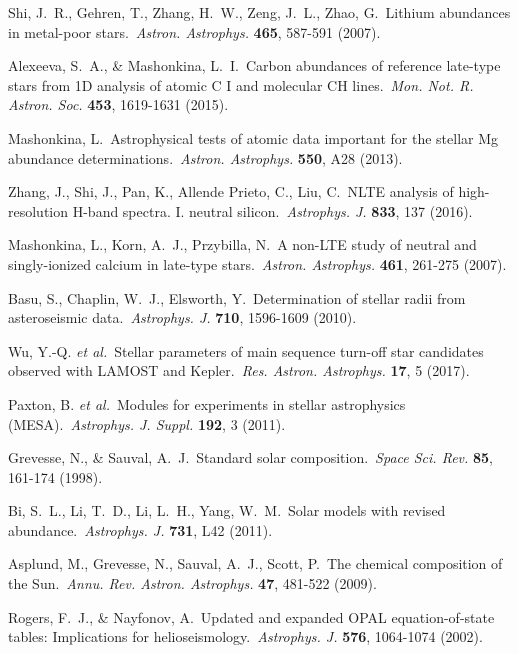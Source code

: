 \documentclass[twoside,onecolumnm,12pt]{article}
\begin{document}
\begin{thebibliography}{99}
 Shi, J.~R., Gehren, T., Zhang, H.~W., Zeng, J.~L., Zhao, G.\ Lithium abundances in metal-poor stars.\ \emph{Astron. Astrophys.} \textbf{465}, 587-591 (2007). %

 Alexeeva, S.~A., \& Mashonkina, L.~I.\ Carbon abundances of reference late-type stars from 1D analysis of atomic C I and molecular CH lines.\ \emph{Mon. Not. R. Astron. Soc.} \textbf{453}, 1619-1631 (2015). %

 Mashonkina, L.\ Astrophysical tests of atomic data important for the stellar Mg abundance determinations.\ \emph{Astron. Astrophys.} \textbf{550}, A28 (2013). %

 Zhang, J., Shi, J., Pan, K., Allende Prieto, C., Liu, C.\ NLTE analysis of high-resolution H-band spectra. I. neutral silicon.\ \emph{Astrophys. J.} \textbf{833}, 137 (2016). %

 Mashonkina, L., Korn, A.~J., Przybilla, N.\ A non-LTE study of neutral and singly-ionized calcium in late-type stars.\ \emph{Astron. Astrophys.} \textbf{461}, 261-275 (2007). %

 Basu, S., Chaplin, W.~J., Elsworth, Y.\ Determination of stellar radii from asteroseismic data.\ \emph{Astrophys. J.} \textbf{710}, 1596-1609 (2010). %

 Wu, Y.-Q. \emph{et al.}\ Stellar parameters of main sequence turn-off star candidates observed with LAMOST and Kepler.\ \emph{Res. Astron. Astrophys.} \textbf{17}, 5 (2017). %

 Paxton, B. \emph{et al.}\ Modules for experiments in stellar astrophysics (MESA).\ \emph{Astrophys. J. Suppl.} \textbf{192}, 3 (2011). %

 Grevesse, N., \& Sauval, A.~J.\ Standard solar composition.\ \emph{Space Sci. Rev.} \textbf{85}, 161-174 (1998). %

 Bi, S.~L., Li, T.~D., Li, L.~H., Yang, W.~M.\ Solar models with revised abundance.\ \emph{Astrophys. J.} \textbf{731}, L42 (2011). %

 Asplund, M., Grevesse, N., Sauval, A.~J., Scott, P.\ The chemical composition of the Sun.\ \emph{Annu. Rev. Astron. Astrophys.} \textbf{47}, 481-522 (2009). %

 Rogers, F.~J., \& Nayfonov, A.\ Updated and expanded OPAL equation-of-state tables: Implications for helioseismology.\ \emph{Astrophys. J.} \textbf{576}, 1064-1074 (2002). %


\end{thebibliography}
\end{document}

